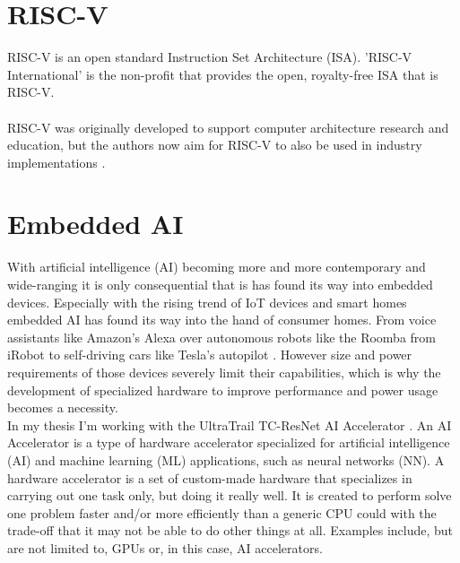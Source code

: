 

\section{RISC-V}

RISC-V \cite{riscv} is an open standard Instruction Set Architecture (ISA).
'RISC-V International' is the non-profit that provides the open, royalty-free ISA that is RISC-V.
\\\\
RISC-V was originally developed to support computer architecture research and education, but the authors now
aim for RISC-V to also be used in industry implementations \cite{riscv_spec}.

\section{Embedded AI}

With artificial intelligence (AI) becoming more and more contemporary and wide-ranging it is only consequential that is has found its way into embedded devices.
Especially with the rising trend of IoT devices and smart homes embedded AI has found its way into the hand of consumer homes.
From voice assistants like Amazon's Alexa \cite{alexa} over autonomous robots like the Roomba \cite{roomba} from iRobot to self-driving cars like Tesla's autopilot \cite{autopilot}.
However size and power requirements of those devices severely limit their capabilities, which is why the development of specialized hardware to improve performance
and power usage becomes a necessity.\\

In my thesis I'm working with the UltraTrail TC-ResNet AI Accelerator \cite{ultratrail}.
An AI Accelerator is a type of hardware accelerator specialized for artificial intelligence (AI) and machine learning (ML) applications, such as neural networks (NN).
A hardware accelerator is a set of custom-made hardware that specializes in carrying out one task only, but doing it really well.
It is created to perform solve one problem faster and/or more efficiently than a generic CPU could with the trade-off that it may not be able to do other things at all.
Examples include, but are not limited to, GPUs or, in this case, AI accelerators.\\\\


